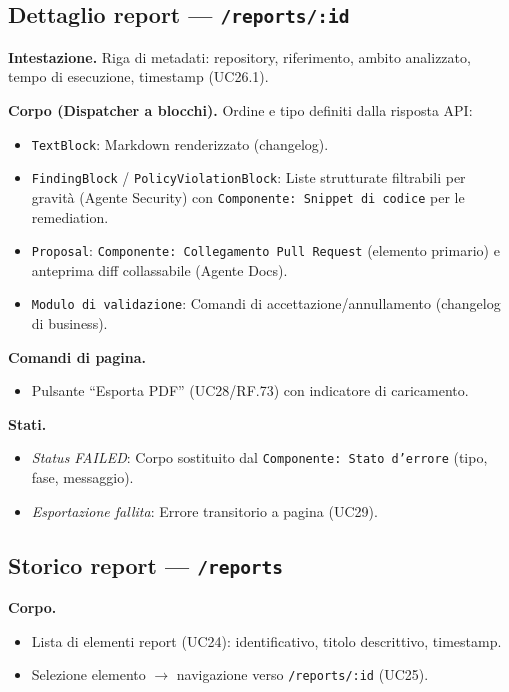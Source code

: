 \documentclass[11pt,a4paper]{article}
\begin{document}
\subsection{Dettaglio report --- \texttt{/reports/:id}}

\textbf{Intestazione.} Riga di metadati: repository, riferimento, ambito analizzato, tempo di esecuzione, timestamp (UC26.1).

\textbf{Corpo (Dispatcher a blocchi).} Ordine e tipo definiti dalla risposta API:
\begin{itemize}
    \item \texttt{TextBlock}: Markdown renderizzato (changelog).
    \item \texttt{FindingBlock} / \texttt{PolicyViolationBlock}: Liste strutturate filtrabili per gravità (Agente Security) con \texttt{Componente: Snippet di codice} per le remediation.
    \item \texttt{Proposal}: \texttt{Componente: Collegamento Pull Request} (elemento primario) e anteprima diff collassabile (Agente Docs).
    \item \texttt{Modulo di validazione}: Comandi di accettazione/annullamento (changelog di business).
\end{itemize}

\textbf{Comandi di pagina.}
\begin{itemize}
    \item Pulsante ``Esporta PDF'' (UC28/RF.73) con indicatore di caricamento.
\end{itemize}

\textbf{Stati.}
\begin{itemize}
    \item \emph{Status FAILED}: Corpo sostituito dal \texttt{Componente: Stato d'errore} (tipo, fase, messaggio).
    \item \emph{Esportazione fallita}: Errore transitorio a pagina (UC29).
\end{itemize}

\subsection{Storico report --- \texttt{/reports}}

\textbf{Corpo.}
\begin{itemize}
    \item Lista di elementi report (UC24): identificativo, titolo descrittivo, timestamp.
    \item Selezione elemento $\to$ navigazione verso \texttt{/reports/:id} (UC25).
\end{itemize}
\end{document}

